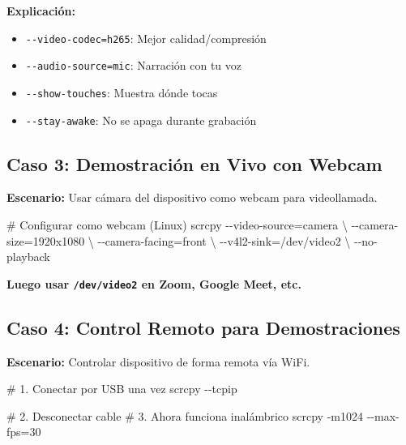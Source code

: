 \documentclass[
  doc,
  floatsintext,
  longtable,
  a4paper,
  nolmodern,
  notxfonts,
  notimes,
  12pt,
  colorlinks=true,linkcolor=blue,citecolor=blue,urlcolor=blue]{apa7}
\newenvironment{Shaded}{\begin{snugshade}}{\end{snugshade}}
\newcommand{\AttributeTok}[1]{\textcolor[rgb]{0.40,0.45,0.13}{#1}}
\newcommand{\CommentTok}[1]{\textcolor[rgb]{0.37,0.37,0.37}{#1}}
\newcommand{\DataTypeTok}[1]{\textcolor[rgb]{0.68,0.00,0.00}{#1}}
\newcommand{\ExtensionTok}[1]{\textcolor[rgb]{0.00,0.23,0.31}{#1}}
\newcommand{\NormalTok}[1]{\textcolor[rgb]{0.00,0.23,0.31}{#1}}
\newcommand{\OperatorTok}[1]{\textcolor[rgb]{0.37,0.37,0.37}{#1}}
\providecommand{\tightlist}{%
  \setlength{\itemsep}{0pt}\setlength{\parskip}{0pt}}
\begin{document}
\textbf{Explicación:}

\begin{itemize}
\tightlist
\item
  \texttt{-\/-video-codec=h265}: Mejor calidad/compresión
\item
  \texttt{-\/-audio-source=mic}: Narración con tu voz
\item
  \texttt{-\/-show-touches}: Muestra dónde tocas
\item
  \texttt{-\/-stay-awake}: No se apaga durante grabación
\end{itemize}

\subsection{Caso 3: Demostración en Vivo con
Webcam}\label{caso-3-demostraciuxf3n-en-vivo-con-webcam}

\textbf{Escenario:} Usar cámara del dispositivo como webcam para
videollamada.

\begin{Shaded}
\begin{Highlighting}[]
\CommentTok{\# Configurar como webcam (Linux)}
\ExtensionTok{scrcpy} \AttributeTok{{-}{-}video{-}source}\OperatorTok{=}\NormalTok{camera }\DataTypeTok{\textbackslash{}}
  \AttributeTok{{-}{-}camera{-}size}\OperatorTok{=}\NormalTok{1920x1080 }\DataTypeTok{\textbackslash{}}
  \AttributeTok{{-}{-}camera{-}facing}\OperatorTok{=}\NormalTok{front }\DataTypeTok{\textbackslash{}}
  \AttributeTok{{-}{-}v4l2{-}sink}\OperatorTok{=}\NormalTok{/dev/video2 }\DataTypeTok{\textbackslash{}}
  \AttributeTok{{-}{-}no{-}playback}
\end{Highlighting}
\end{Shaded}

\textbf{Luego usar \texttt{/dev/video2} en Zoom, Google Meet, etc.}

\subsection{Caso 4: Control Remoto para
Demostraciones}\label{caso-4-control-remoto-para-demostraciones}

\textbf{Escenario:} Controlar dispositivo de forma remota vía WiFi.

\begin{Shaded}
\begin{Highlighting}[]
\CommentTok{\# 1. Conectar por USB una vez}
\ExtensionTok{scrcpy} \AttributeTok{{-}{-}tcpip}

\CommentTok{\# 2. Desconectar cable}
\CommentTok{\# 3. Ahora funciona inalámbrico}
\ExtensionTok{scrcpy} \AttributeTok{{-}m1024} \AttributeTok{{-}{-}max{-}fps}\OperatorTok{=}\NormalTok{30}
\end{Highlighting}
\end{Shaded}
\end{document}
